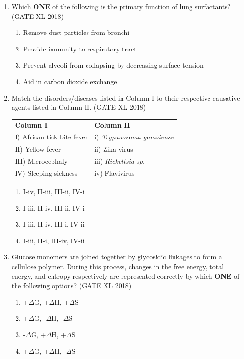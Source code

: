 \documentclass[14pt]{extarticle}
\begin{document}
\begin{flushleft}
\begin{enumerate}
    \item Which \textbf{ONE} of the following is the primary function of lung surfactants?\\
    \hfill(GATE XL 2018)\\
    \begin{enumerate}[label=(\Alph*)]
        \item Remove dust particles from bronchi
        \item Provide immunity to respiratory tract
        \item Prevent alveoli from collapsing by decreasing surface tension
        \item Aid in carbon dioxide exchange
    \end{enumerate}

    \item Match the disorders/diseases listed in Column I to their respective causative agents listed in Column II. \hfill(GATE XL 2018)\\
\begin{tabular}{p{6cm} p{6cm}}
\textbf{Column I} & \textbf{Column II} \\
I) African tick bite fever & i) \textit{Trypanosoma gambiense} \\
II) Yellow fever & ii) Zika virus \\
III) Microcephaly & iii) \textit{Rickettsia sp.} \\
IV) Sleeping sickness & iv) Flavivirus \\
\end{tabular}

\begin{multicols}{2}
 \begin{enumerate}[label=(\Alph*)]
        \item I-iv, II-iii, III-ii, IV-i
        \item I-iii, II-iv, III-ii, IV-i
        \item I-iii, II-iv, III-i, IV-ii
        \item I-iii, II-i, III-iv, IV-ii
    \end{enumerate}
    \end{multicols}

    \item Glucose monomers are joined together by glycosidic linkages to form a cellulose polymer. During this process, changes in the free energy, total energy, and entropy respectively are represented correctly by which \textbf{ONE} of the following options? \hfill(GATE XL 2018)\\
    \begin{multicols}{2}
    \begin{enumerate}[label=(\Alph*)]
        \item +$\Delta$G, +$\Delta$H, +$\Delta$S
        \item +$\Delta$G, -$\Delta$H, -$\Delta$S
        \item -$\Delta$G, +$\Delta$H, +$\Delta$S
        \item +$\Delta$G, +$\Delta$H, -$\Delta$S
    \end{enumerate}
    \end{multicols}


\end{enumerate}
\end{flushleft}
\end{document}
